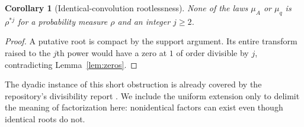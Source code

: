 \documentclass[11pt,a4paper]{article}
\newtheorem{corollary}[theorem]{Corollary}
\theoremstyle{definition}
\theoremstyle{remark}
\begin{document}
\begin{corollary}[Identical-convolution rootlessness]\label{cor:rootless}
None of the laws $\mu_A$ or $\mu_q$ is $\rho^{*j}$ for a probability
measure $\rho$ and an integer $j\ge2$.
\end{corollary}
\begin{proof}
A putative root is compact by the support argument. Its entire transform
raised to the $j$th power would have a zero at $1$ of order divisible by
$j$, contradicting Lemma~\ref{lem:zeros}.
\end{proof}
\noindent The dyadic instance of this short obstruction is already covered
by the repository's divisibility report \cite{repo-shape}. We include the
uniform extension only to delimit the meaning of factorization here:
nonidentical factors can exist even though identical roots do not.
\end{document}
